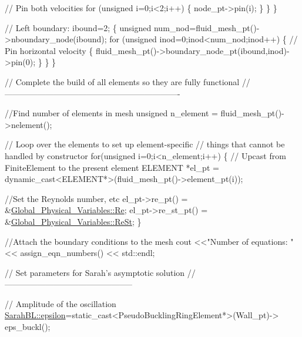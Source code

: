 \begin{DoxyCodeInclude}
     \textcolor{comment}{// Pin both velocities}
     \textcolor{keywordflow}{for} (\textcolor{keywordtype}{unsigned} i=0;i<2;i++)
      \{
       node\_pt->pin(i); 
      \}
    \}
  \}
                        
 \textcolor{comment}{// Left boundary:}
 ibound=2;
  \{
   \textcolor{keywordtype}{unsigned} num\_nod=fluid\_mesh\_pt()->nboundary\_node(ibound);
   \textcolor{keywordflow}{for} (\textcolor{keywordtype}{unsigned} inod=0;inod<num\_nod;inod++)
    \{
     \textcolor{comment}{// Pin horizontal velocity}
      \{
       fluid\_mesh\_pt()->boundary\_node\_pt(ibound,inod)->pin(0);
      \}
    \}
  \}


 \textcolor{comment}{// Complete the build of all elements so they are fully functional}
 \textcolor{comment}{//----------------------------------------------------------------}

 \textcolor{comment}{//Find number of elements in mesh}
 \textcolor{keywordtype}{unsigned} n\_element = fluid\_mesh\_pt()->nelement();

 \textcolor{comment}{// Loop over the elements to set up element-specific }
 \textcolor{comment}{// things that cannot be handled by constructor}
 \textcolor{keywordflow}{for}(\textcolor{keywordtype}{unsigned} i=0;i<n\_element;i++)
  \{
   \textcolor{comment}{// Upcast from FiniteElement to the present element}
   ELEMENT *el\_pt = \textcolor{keyword}{dynamic\_cast<}ELEMENT*\textcolor{keyword}{>}(fluid\_mesh\_pt()->element\_pt(i));

   \textcolor{comment}{//Set the Reynolds number, etc}
   el\_pt->re\_pt() = &\hyperlink{namespaceGlobal__Physical__Variables_ab814e627d2eb5bc50318879d19ab16b9}{Global\_Physical\_Variables::Re};
   el\_pt->re\_st\_pt() = &\hyperlink{namespaceGlobal__Physical__Variables_a085ee4bf968ffdd01a41b8c41864f907}{Global\_Physical\_Variables::ReSt};
  \}


 \textcolor{comment}{//Attach the boundary conditions to the mesh}
 cout <<\textcolor{stringliteral}{"Number of equations: "} << assign\_eqn\_numbers() << std::endl; 
 

 \textcolor{comment}{// Set parameters for Sarah's asymptotic solution}
 \textcolor{comment}{//-----------------------------------------------}

 \textcolor{comment}{// Amplitude of the oscillation}
 \hyperlink{namespaceoomph_1_1SarahBL_a21bfe7e71f0baa62022d1ecc9bd175de}{SarahBL::epsilon}=\textcolor{keyword}{static\_cast<}PseudoBucklingRingElement*\textcolor{keyword}{>}(Wall\_pt)->
  eps\_buckl();


\end{DoxyCodeInclude}

